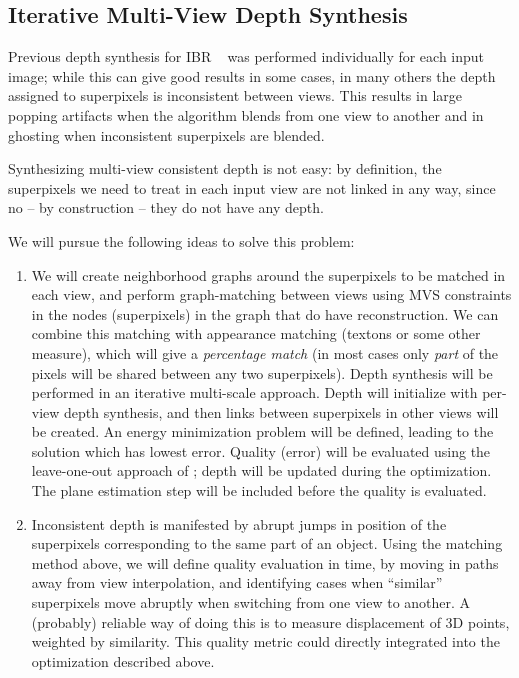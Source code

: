 \subsection{Iterative Multi-View Depth Synthesis}


Previous depth synthesis for IBR ~\cite{chaurasia13} was performed individually for each input image;
while this can give good results in some cases, in many others the depth assigned to superpixels
is inconsistent between views. This results in large popping artifacts when the algorithm blends
from one view to another and in ghosting when inconsistent superpixels are blended.

Synthesizing multi-view consistent depth is not easy: by definition, the superpixels we need
to treat in each input view are not linked in any way, since no -- by construction -- they do not
have any depth.

We will pursue the following ideas to solve this problem:
\begin{enumerate}
\item We will create neighborhood graphs around the superpixels to be matched in each view, and perform graph-matching between views using MVS constraints in the nodes (superpixels) in the graph that do have reconstruction. We can combine this matching with appearance matching (textons or some other measure), which will give a \emph{percentage match} (in most cases only \emph{part} of the pixels will be shared between any two superpixels). Depth synthesis will be performed in an iterative multi-scale approach. Depth will initialize with per-view depth synthesis, and then links between superpixels in other views will be created. An energy minimization problem will be defined, leading to the solution which has lowest error.
Quality (error) will be evaluated using the leave-one-out approach of \cite{ODD15}; depth will be updated during the optimization. The plane estimation step will be included before the quality is evaluated.
\item Inconsistent depth is manifested by abrupt jumps in position of the superpixels corresponding to the same part of an object. Using the matching method above, we will define quality evaluation in time, by moving in paths away from view interpolation, and identifying cases when ``similar'' superpixels move abruptly when switching from one view to another. A (probably) reliable way of doing this is to measure displacement of 3D points, weighted by similarity. This quality metric could directly integrated into the optimization described above.
\end{enumerate}

